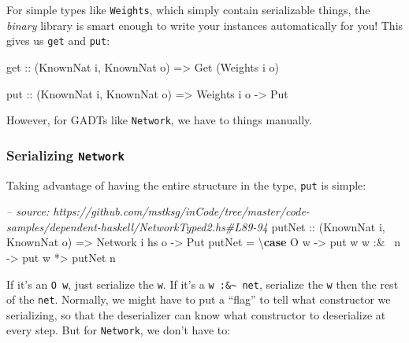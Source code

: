 \documentclass[]{article}
\newenvironment{Shaded}{\begin{snugshade}}{\end{snugshade}}
\newcommand{\CommentTok}[1]{\textcolor[rgb]{0.56,0.35,0.01}{\textit{#1}}}
\newcommand{\DataTypeTok}[1]{\textcolor[rgb]{0.13,0.29,0.53}{#1}}
\newcommand{\FunctionTok}[1]{\textcolor[rgb]{0.00,0.00,0.00}{#1}}
\newcommand{\KeywordTok}[1]{\textcolor[rgb]{0.13,0.29,0.53}{\textbf{#1}}}
\newcommand{\NormalTok}[1]{#1}
\newcommand{\OtherTok}[1]{\textcolor[rgb]{0.56,0.35,0.01}{#1}}
\begin{document}
For simple types like \texttt{Weights}, which simply contain serializable
things, the \emph{binary} library is smart enough to write your instances
automatically for you! This gives us \texttt{get} and \texttt{put}:

\begin{Shaded}
\begin{Highlighting}[]
\OtherTok{get ::}\NormalTok{ (}\DataTypeTok{KnownNat}\NormalTok{ i, }\DataTypeTok{KnownNat}\NormalTok{ o)}
    \OtherTok{=>} \DataTypeTok{Get}\NormalTok{ (}\DataTypeTok{Weights}\NormalTok{ i o)}

\OtherTok{put ::}\NormalTok{ (}\DataTypeTok{KnownNat}\NormalTok{ i, }\DataTypeTok{KnownNat}\NormalTok{ o)}
    \OtherTok{=>} \DataTypeTok{Weights}\NormalTok{ i o}
    \OtherTok{->} \DataTypeTok{Put}
\end{Highlighting}
\end{Shaded}

However, for GADTs like \texttt{Network}, we have to things manually.

\hypertarget{serializing-network}{%
\subsubsection{\texorpdfstring{Serializing
\texttt{Network}}{Serializing Network}}\label{serializing-network}}

Taking advantage of having the entire structure in the type, \texttt{put} is
simple:

\begin{Shaded}
\begin{Highlighting}[]
\CommentTok{-- source: https://github.com/mstksg/inCode/tree/master/code-samples/dependent-haskell/NetworkTyped2.hs#L89-94}
\OtherTok{putNet ::}\NormalTok{ (}\DataTypeTok{KnownNat}\NormalTok{ i, }\DataTypeTok{KnownNat}\NormalTok{ o)}
       \OtherTok{=>} \DataTypeTok{Network}\NormalTok{ i hs o}
       \OtherTok{->} \DataTypeTok{Put}
\NormalTok{putNet }\FunctionTok{=}\NormalTok{ \textbackslash{}}\KeywordTok{case}
    \DataTypeTok{O}\NormalTok{ w     }\OtherTok{->}\NormalTok{ put w}
\NormalTok{    w }\FunctionTok{:&~}\NormalTok{ n }\OtherTok{->}\NormalTok{ put w }\FunctionTok{*>}\NormalTok{ putNet n}
\end{Highlighting}
\end{Shaded}

If it's an \texttt{O\ w}, just serialize the \texttt{w}. If it's a
\texttt{w\ :\&\textasciitilde{}\ net}, serialize the \texttt{w} then the rest of
the \texttt{net}. Normally, we might have to put a ``flag'' to tell what
constructor we serializing, so that the deserializer can know what constructor
to deserialize at every step. But for \texttt{Network}, we don't have to:
\end{document}
